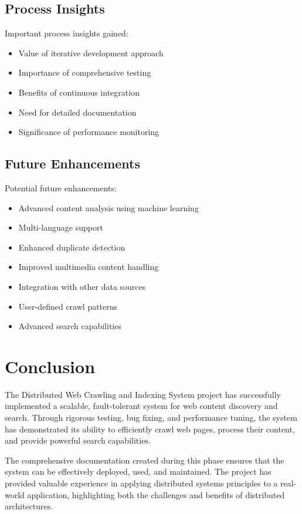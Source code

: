 \documentclass[12pt,a4paper]{report}
\begin{document}
\section{Process Insights}
Important process insights gained:
\begin{itemize}
    \item Value of iterative development approach
    \item Importance of comprehensive testing
    \item Benefits of continuous integration
    \item Need for detailed documentation
    \item Significance of performance monitoring
\end{itemize}

\section{Future Enhancements}
Potential future enhancements:
\begin{itemize}
    \item Advanced content analysis using machine learning
    \item Multi-language support
    \item Enhanced duplicate detection
    \item Improved multimedia content handling
    \item Integration with other data sources
    \item User-defined crawl patterns
    \item Advanced search capabilities
\end{itemize}

\chapter{Conclusion}

The Distributed Web Crawling and Indexing System project has successfully implemented a scalable, fault-tolerant system for web content discovery and search. Through rigorous testing, bug fixing, and performance tuning, the system has demonstrated its ability to efficiently crawl web pages, process their content, and provide powerful search capabilities.

The comprehensive documentation created during this phase ensures that the system can be effectively deployed, used, and maintained. The project has provided valuable experience in applying distributed systems principles to a real-world application, highlighting both the challenges and benefits of distributed architectures.
\end{document}
